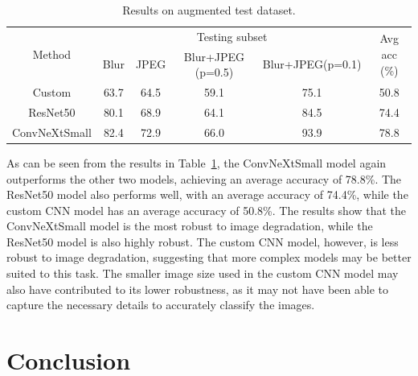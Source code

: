 \documentclass[runningheads]{llncs}
\begin{document}
\begin{table}[h]
    \centering
    \caption{Results on augmented test dataset.}
    \begin{tabular}{c|c|c|c|c|c}
    \hline
    \multirow{2}{*}{Method} & \multicolumn{4}{c|}{Testing subset} & \multirow{2}{*}{Avg acc (\%)} \\ \cline{2-5}
                                      & Blur & JPEG & Blur+JPEG (p=0.5) & Blur+JPEG(p=0.1) & \\ \hline
    Custom                            & 63.7   & 64.5   & 59.1   & 75.1   & 50.8 \\ \hline
    ResNet50                          & 80.1   & 68.9   & 64.1   & 84.5   & 74.4 \\ \hline
    ConvNeXtSmall                     & 82.4   & 72.9   & 66.0   & 93.9   & 78.8 \\ \hline
    \end{tabular}
    \label{tab:augmentedresults}
\end{table}

As can be seen from the results in Table~\ref{tab:augmentedresults}, the ConvNeXtSmall model again outperforms the other two models, achieving an average accuracy of 78.8\%. The ResNet50 model also performs well, with an average accuracy of 74.4\%, while the custom CNN model has an average accuracy of 50.8\%. The results show that the ConvNeXtSmall model is the most robust to image degradation, while the ResNet50 model is also highly robust. The custom CNN model, however, is less robust to image degradation, suggesting that more complex models may be better suited to this task. The smaller image size used in the custom CNN model may also have contributed to its lower robustness, as it may not have been able to capture the necessary details to accurately classify the images.
%
%
\section{Conclusion}
\end{document}
